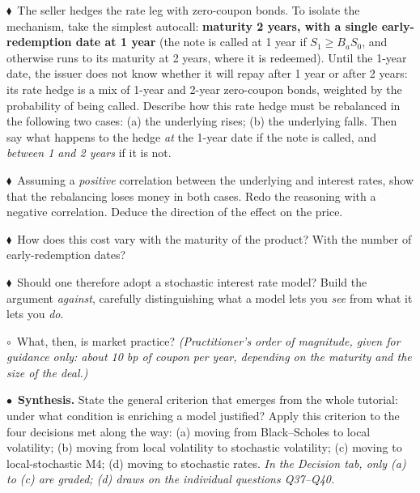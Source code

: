 \documentclass[11pt,a4paper]{article}
\newcommand{\team}{\textcolor{teamblue}{$\bullet$}}
\newcommand{\indiv}{\textcolor{indivred}{$\blacklozenge$}}
\newcommand{\opt}{$\circ$}
\begin{document}
\begin{questions}[resume]
  \item \indiv\ The seller hedges the rate leg with zero-coupon bonds. To isolate the mechanism, take the
  simplest autocall: \textbf{maturity 2 years, with a single early-redemption date at 1 year} (the
  note is called at 1 year if $S_1 \geq B_a S_0$, and otherwise runs to its maturity at 2 years, where it is
  redeemed). Until the 1-year date, the issuer does not know whether it will repay after 1 year or
  after 2 years: its rate hedge is a mix of 1-year and 2-year zero-coupon bonds, weighted by the
  probability of being called. Describe how this rate hedge must be rebalanced in the following
  two cases: (a) the underlying rises; (b) the underlying falls. Then say what happens to the
  hedge \emph{at} the 1-year date if the note is called, and \emph{between 1 and 2 years} if it is not.

  \item \indiv\ Assuming a \emph{positive} correlation between the underlying and interest rates, show that the
  rebalancing loses money in both cases. Redo the reasoning with a negative correlation. Deduce
  the direction of the effect on the price.

  \item \indiv\ How does this cost vary with the maturity of the product? With the number of early-redemption dates?

  \item \indiv\ Should one therefore adopt a stochastic interest rate model? Build the argument \emph{against},
  carefully distinguishing what a model lets you \emph{see} from what it lets you \emph{do}.

  \item \opt\ What, then, is market practice? \emph{(Practitioner's order of magnitude, given for guidance only:
  about 10 bp of coupon per year, depending on the maturity and the size of the deal.)}

  \item \team\ \textbf{Synthesis.} State the general criterion that emerges from the whole tutorial: under what
  condition is enriching a model justified? Apply this criterion to the four decisions met along
  the way: (a) moving from Black--Scholes to local volatility; (b) moving from local volatility to
  stochastic volatility; (c) moving to local-stochastic M4; (d) moving to stochastic rates. \emph{In the
  Decision tab, only (a) to (c) are graded; (d) draws on the individual questions Q37--Q40.}
\end{questions}
\end{document}

